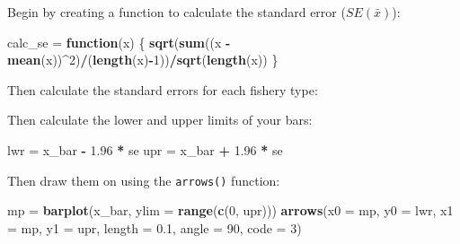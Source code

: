 \documentclass[]{book}
\newenvironment{Shaded}{\begin{snugshade}}{\end{snugshade}}
\newcommand{\KeywordTok}[1]{\textcolor[rgb]{0.13,0.29,0.53}{\textbf{#1}}}
\newcommand{\DataTypeTok}[1]{\textcolor[rgb]{0.13,0.29,0.53}{#1}}
\newcommand{\DecValTok}[1]{\textcolor[rgb]{0.00,0.00,0.81}{#1}}
\newcommand{\FloatTok}[1]{\textcolor[rgb]{0.00,0.00,0.81}{#1}}
\newcommand{\StringTok}[1]{\textcolor[rgb]{0.31,0.60,0.02}{#1}}
\newcommand{\ControlFlowTok}[1]{\textcolor[rgb]{0.13,0.29,0.53}{\textbf{#1}}}
\newcommand{\OperatorTok}[1]{\textcolor[rgb]{0.81,0.36,0.00}{\textbf{#1}}}
\newcommand{\NormalTok}[1]{#1}
\theoremstyle{definition}
\theoremstyle{definition}
\theoremstyle{definition}
\theoremstyle{remark}
\begin{document}
Begin by creating a function to calculate the standard error
(\(SE(\bar{x})\)):

\begin{Shaded}
\begin{Highlighting}[]
\NormalTok{calc_se =}\StringTok{ }\ControlFlowTok{function}\NormalTok{(x) \{}
  \KeywordTok{sqrt}\NormalTok{(}\KeywordTok{sum}\NormalTok{((x }\OperatorTok{-}\StringTok{ }\KeywordTok{mean}\NormalTok{(x))}\OperatorTok{^}\DecValTok{2}\NormalTok{)}\OperatorTok{/}\NormalTok{(}\KeywordTok{length}\NormalTok{(x)}\OperatorTok{-}\DecValTok{1}\NormalTok{))}\OperatorTok{/}\KeywordTok{sqrt}\NormalTok{(}\KeywordTok{length}\NormalTok{(x))}
\NormalTok{\}}
\end{Highlighting}
\end{Shaded}

Then calculate the standard errors for each fishery type:

\begin{Shaded}
\end{Shaded}

Then calculate the lower and upper limits of your bars:

\begin{Shaded}
\begin{Highlighting}[]
\NormalTok{lwr =}\StringTok{ }\NormalTok{x_bar }\OperatorTok{-}\StringTok{ }\FloatTok{1.96} \OperatorTok{*}\StringTok{ }\NormalTok{se}
\NormalTok{upr =}\StringTok{ }\NormalTok{x_bar }\OperatorTok{+}\StringTok{ }\FloatTok{1.96} \OperatorTok{*}\StringTok{ }\NormalTok{se}
\end{Highlighting}
\end{Shaded}

Then draw them on using the \texttt{arrows()} function:

\begin{Shaded}
\begin{Highlighting}[]
\NormalTok{mp =}\StringTok{ }\KeywordTok{barplot}\NormalTok{(x_bar, }\DataTypeTok{ylim =} \KeywordTok{range}\NormalTok{(}\KeywordTok{c}\NormalTok{(}\DecValTok{0}\NormalTok{, upr)))}
\KeywordTok{arrows}\NormalTok{(}\DataTypeTok{x0 =}\NormalTok{ mp, }\DataTypeTok{y0 =}\NormalTok{ lwr, }\DataTypeTok{x1 =}\NormalTok{ mp, }\DataTypeTok{y1 =}\NormalTok{ upr, }\DataTypeTok{length =} \FloatTok{0.1}\NormalTok{, }\DataTypeTok{angle =} \DecValTok{90}\NormalTok{, }\DataTypeTok{code =} \DecValTok{3}\NormalTok{)}
\end{Highlighting}
\end{Shaded}
\end{document}
